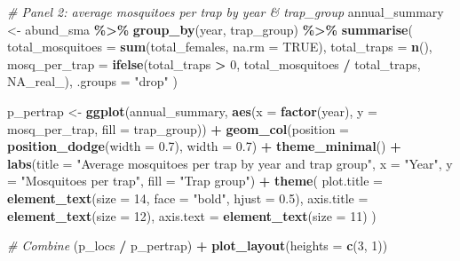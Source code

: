 \documentclass[
  letterpaper,
]{krantz}
\newenvironment{Shaded}{\begin{snugshade}}{\end{snugshade}}
\newcommand{\AttributeTok}[1]{\textcolor[rgb]{0.13,0.29,0.53}{#1}}
\newcommand{\CommentTok}[1]{\textcolor[rgb]{0.56,0.35,0.01}{\textit{#1}}}
\newcommand{\ConstantTok}[1]{\textcolor[rgb]{0.56,0.35,0.01}{#1}}
\newcommand{\DecValTok}[1]{\textcolor[rgb]{0.00,0.00,0.81}{#1}}
\newcommand{\FloatTok}[1]{\textcolor[rgb]{0.00,0.00,0.81}{#1}}
\newcommand{\FunctionTok}[1]{\textcolor[rgb]{0.13,0.29,0.53}{\textbf{#1}}}
\newcommand{\NormalTok}[1]{#1}
\newcommand{\OtherTok}[1]{\textcolor[rgb]{0.56,0.35,0.01}{#1}}
\newcommand{\SpecialCharTok}[1]{\textcolor[rgb]{0.81,0.36,0.00}{\textbf{#1}}}
\newcommand{\StringTok}[1]{\textcolor[rgb]{0.31,0.60,0.02}{#1}}
\begin{document}
\begin{Shaded}
\begin{Highlighting}[]
\CommentTok{\# Panel 2: average mosquitoes per trap by year \& trap\_group}
\NormalTok{annual\_summary }\OtherTok{\textless{}{-}}\NormalTok{ abund\_sma }\SpecialCharTok{\%\textgreater{}\%}
  \FunctionTok{group\_by}\NormalTok{(year, trap\_group) }\SpecialCharTok{\%\textgreater{}\%}
  \FunctionTok{summarise}\NormalTok{(}
    \AttributeTok{total\_mosquitoes =} \FunctionTok{sum}\NormalTok{(total\_females, }\AttributeTok{na.rm =} \ConstantTok{TRUE}\NormalTok{),}
    \AttributeTok{total\_traps =} \FunctionTok{n}\NormalTok{(),}
    \AttributeTok{mosq\_per\_trap =} \FunctionTok{ifelse}\NormalTok{(total\_traps }\SpecialCharTok{\textgreater{}} \DecValTok{0}\NormalTok{, total\_mosquitoes }\SpecialCharTok{/}\NormalTok{ total\_traps, }\ConstantTok{NA\_real\_}\NormalTok{),}
    \AttributeTok{.groups =} \StringTok{"drop"}
\NormalTok{  )}

\NormalTok{p\_pertrap }\OtherTok{\textless{}{-}} \FunctionTok{ggplot}\NormalTok{(annual\_summary,}
                    \FunctionTok{aes}\NormalTok{(}\AttributeTok{x =} \FunctionTok{factor}\NormalTok{(year), }\AttributeTok{y =}\NormalTok{ mosq\_per\_trap, }\AttributeTok{fill =}\NormalTok{ trap\_group)) }\SpecialCharTok{+}
  \FunctionTok{geom\_col}\NormalTok{(}\AttributeTok{position =} \FunctionTok{position\_dodge}\NormalTok{(}\AttributeTok{width =} \FloatTok{0.7}\NormalTok{), }\AttributeTok{width =} \FloatTok{0.7}\NormalTok{) }\SpecialCharTok{+}
  \FunctionTok{theme\_minimal}\NormalTok{() }\SpecialCharTok{+}
  \FunctionTok{labs}\NormalTok{(}\AttributeTok{title =} \StringTok{"Average mosquitoes per trap by year and trap group"}\NormalTok{,}
       \AttributeTok{x =} \StringTok{"Year"}\NormalTok{, }\AttributeTok{y =} \StringTok{"Mosquitoes per trap"}\NormalTok{, }\AttributeTok{fill =} \StringTok{"Trap group"}\NormalTok{) }\SpecialCharTok{+}
  \FunctionTok{theme}\NormalTok{(}
    \AttributeTok{plot.title =} \FunctionTok{element\_text}\NormalTok{(}\AttributeTok{size =} \DecValTok{14}\NormalTok{, }\AttributeTok{face =} \StringTok{"bold"}\NormalTok{, }\AttributeTok{hjust =} \FloatTok{0.5}\NormalTok{),}
    \AttributeTok{axis.title =} \FunctionTok{element\_text}\NormalTok{(}\AttributeTok{size =} \DecValTok{12}\NormalTok{),}
    \AttributeTok{axis.text =} \FunctionTok{element\_text}\NormalTok{(}\AttributeTok{size =} \DecValTok{11}\NormalTok{)}
\NormalTok{  )}

\CommentTok{\# Combine}
\NormalTok{(p\_locs }\SpecialCharTok{/}\NormalTok{ p\_pertrap) }\SpecialCharTok{+}
  \FunctionTok{plot\_layout}\NormalTok{(}\AttributeTok{heights =} \FunctionTok{c}\NormalTok{(}\DecValTok{3}\NormalTok{, }\DecValTok{1}\NormalTok{))}
\end{Highlighting}
\end{Shaded}
\end{document}
